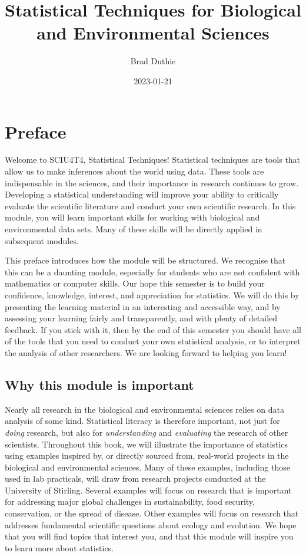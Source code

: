 \documentclass[
]{scrbook}
\title{Statistical Techniques for Biological and Environmental Sciences}
\author{Brad Duthie}
\date{2023-01-21}
\begin{document}
\maketitle

{
\hypersetup{linkcolor=}
\setcounter{tocdepth}{1}
\tableofcontents
}
\hypertarget{preface}{%
\chapter*{Preface}\label{preface}}

Welcome to SCIU4T4, Statistical Techniques!
Statistical techniques are tools that allow us to make inferences about the world using data.
These tools are indispensable in the sciences, and their importance in research continues to grow.
Developing a statistical understanding will improve your ability to critically evaluate the scientific literature and conduct your own scientific research.
In this module, you will learn important skills for working with biological and environmental data sets.
Many of these skills will be directly applied in subsequent modules.

This preface introduces how the module will be structured.
We recognise that this can be a daunting module, especially for students who are not confident with mathematics or computer skills.
Our hope this semester is to build your confidence, knowledge, interest, and appreciation for statistics.
We will do this by presenting the learning material in an interesting and accessible way, and by assessing your learning fairly and transparently, and with plenty of detailed feedback.
If you stick with it, then by the end of this semester you should have all of the tools that you need to conduct your own statistical analysis, or to interpret the analysis of other researchers.
We are looking forward to helping you learn!

\hypertarget{why-this-module-is-important}{%
\section*{Why this module is important}\label{why-this-module-is-important}}

Nearly all research in the biological and environmental sciences relies on data analysis of some kind.
Statistical literacy is therefore important, not just for \emph{doing} research, but also for \emph{understanding} and \emph{evaluating} the research of other scientists.
Throughout this book, we will illustrate the importance of statistics using examples inspired by, or directly sourced from, real-world projects in the biological and environmental sciences.
Many of these examples, including those used in lab practicals, will draw from research projects conducted at the University of Stirling.
Several examples will focus on research that is important for addressing major global challenges in sustainability, food security, conservation, or the spread of disease.
Other examples will focus on research that addresses fundamental scientific questions about ecology and evolution.
We hope that you will find topics that interest you, and that this module will inspire you to learn more about statistics.
\end{document}
